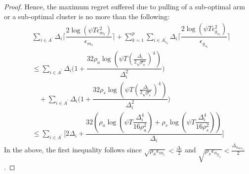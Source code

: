 \begin{proof}
Hence, the maximum regret suffered due to pulling of a sub-optimal arm or a sub-optimal cluster is no more than the following:
 \begin{align*}
 &\sum_{i\in A^{'}}\Delta_{i}\bigg\lceil\dfrac{2\log{(\psi T\epsilon_{m_{i}}^{2})}}{\epsilon_{m_{i}}}\bigg\rceil 
\!+\! \sum_{k=1}^{p}\sum_{i\in A_{s_{k}}^{'}}\Delta_{i}\bigg\lceil\dfrac{2\log{(\psi T\epsilon_{g_{s_{k}}}^{2})}}{\epsilon_{g_{s_{k}}}}\bigg\rceil \\
&\leq\sum_{i\in A^{'}}\Delta_{i}\bigg(1+\dfrac{32\rho_{a}\log{\left(\psi T\left(\frac{\Delta_{i}}{2\sqrt{\rho_{a}}}\right)^{4}\right)}}{\Delta_{i}^{2}}\bigg) \\
&\quad+ \sum_{i\in A^{'}}\Delta_{i}\bigg(1+\dfrac{32\rho_{s}\log{\left(\psi T\left(\frac{\Delta_{i}}{2\sqrt{\rho_{s}}}\right)^{4}\right)}}{\Delta_{i}^{2}}\bigg)
\\
 &\leq \sum_{i\in A^{'}}\!\bigg[ 2\Delta_{i}+\dfrac{32(\rho_{a}\log{(\psi T\dfrac{\Delta_{i}^{4}}{16\rho_{a}^{2}})} + \rho_{s}\log{(\psi T\dfrac{\Delta_{i}^{4}}{16\rho_{s}^{2}})})}{\Delta_{i}} \bigg]
 \end{align*}
In the above, the first inequality follows since $\sqrt{\rho_{a}\epsilon_{m_{i}}} < \frac{\Delta_{i}}{2}$ and $\sqrt{\rho_{s}\epsilon_{n_{g_{s_{k}}}}} < \frac{\Delta_{a_{\max_{s_{k}}}}}{2}$.

 

\end{proof}
